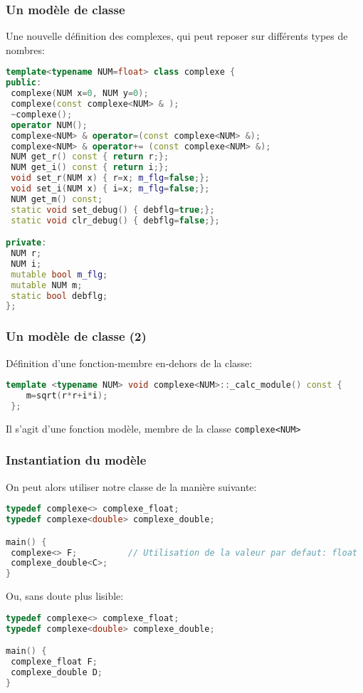 \documentclass{beamer}
\begin{document}
\begin{frame}[fragile=singleslide,shrink=20]
\frametitle {Un modèle de classe}

Une nouvelle définition des complexes, qui peut reposer sur différents types de nombres:
\begin{lstlisting}[language=c++]
template<typename NUM=float> class complexe {
public:
 complexe(NUM x=0, NUM y=0);
 complexe(const complexe<NUM> & );
 ~complexe();
 operator NUM();
 complexe<NUM> & operator=(const complexe<NUM> &);
 complexe<NUM> & operator+= (const complexe<NUM> &);
 NUM get_r() const { return r;};
 NUM get_i() const { return i;};
 void set_r(NUM x) { r=x; m_flg=false;};
 void set_i(NUM x) { i=x; m_flg=false;};
 NUM get_m() const;
 static void set_debug() { debflg=true;};
 static void clr_debug() { debflg=false;};

private:
 NUM r;
 NUM i;
 mutable bool m_flg;
 mutable NUM m;
 static bool debflg;
};
\end{lstlisting}
\end{frame}

\begin{frame}[fragile=singleslide,shrink=20]
\frametitle {Un modèle de classe (2)}

Définition d'une fonction-membre en-dehors de la classe:
\begin{lstlisting}[language=c++]
 template <typename NUM> void complexe<NUM>::_calc_module() const {
    m=sqrt(r*r+i*i);
 };
\end{lstlisting}
Il s'agit d'une fonction modèle, membre de la classe \texttt{complexe<NUM>}
\end{frame}

\begin{frame}[fragile=singleslide,shrink=20]
\frametitle {Instantiation du modèle}

On peut alors utiliser notre classe de la manière suivante:
\begin{lstlisting}[language=c++]
typedef complexe<> complexe_float;
typedef complexe<double> complexe_double;

main() {
 complexe<> F;          // Utilisation de la valeur par defaut: float
 complexe_double<C>;    
}
\end{lstlisting}

Ou, sans doute plus lisible:
\begin{lstlisting}[language=c++]
typedef complexe<> complexe_float;
typedef complexe<double> complexe_double;

main() {
 complexe_float F;
 complexe_double D;
}
\end{lstlisting}
\end{frame}
\end{document}
